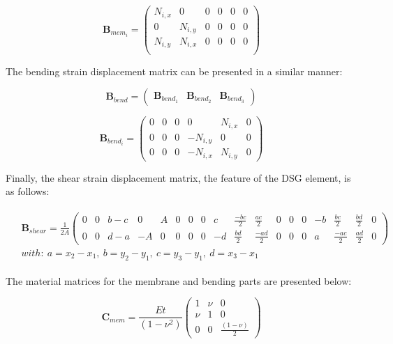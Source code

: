 \begin{equation} 
\mathbf{B}_{mem_i} =  \begin{pmatrix}
N_{i,x} & 0 & 0 & 0 & 0 & 0 \\
0 & N_{i,y} & 0 & 0 & 0 & 0 \\
N_{i,y} & N_{i,x} & 0 & 0 & 0 & 0 \\
\end{pmatrix} 
\label{eqt7}
\end{equation}

The bending strain displacement matrix can be presented in a similar manner:

\begin{equation} 
\mathbf{B}_{bend} =  \begin{pmatrix}
\mathbf{B}_{bend_1} & \mathbf{B}_{bend_2} & \mathbf{B}_{bend_3}
\end{pmatrix} 
\label{eqt8}
\end{equation}

\begin{equation} 
\mathbf{B}_{bend_i} =  \begin{pmatrix}
0 & 0 & 0 & 0 & N_{i,x} & 0 \\
0 & 0 & 0 & -N_{i,y} & 0 & 0 \\
0 & 0 & 0 & -N_{i,x} & N_{i,y} & 0
\end{pmatrix} 
\label{eqt9}
\end{equation}

Finally, the shear strain displacement matrix, the feature of the DSG element, is as follows:

\begin{gather} 
	\begin{aligned}
		& \mathbf{B}_{shear} =  \frac{1}{2 A}
		\begin{pmatrix}
			0 & 0 & b-c & 0 & A & 0 & 0 & 0 & c & \frac{-bc}{2} & \frac{ac}{2} & 0 & 0 & 0 & -b & \frac{bc}{2} & \frac{bd}{2} & 0 \\
			0 & 0 & d-a & -A & 0 & 0 & 0 & 0 & -d & \frac{bd}{2} & \frac{-ad}{2} & 0 & 0 & 0 & a & \frac{-ac}{2} & \frac{ad}{2} & 0
		\end{pmatrix}
		\\
		& with:\ 
		a = x_2-x_1,\ 
		b = y_2-y_1,\ 
		c = y_3-y_1,\ 
		d = x_3 - x_1
		\label{eqt10}
	\end{aligned}
\end{gather}

The material matrices for the membrane and bending parts are presented below:

\begin{equation} 
\mathbf{C}_{mem} =  \frac{Et}{(1-\nu^2)}
\begin{pmatrix}
1 & \nu & 0 \\
\nu & 1 & 0 \\
0 & 0 & \frac{(1-\nu)}{2}
\end{pmatrix}
\label{eqt11}
\end{equation}

